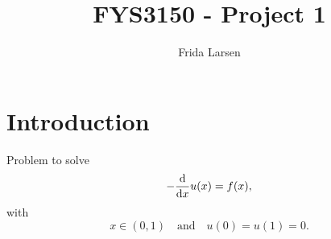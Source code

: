 \documentclass[notitlepage, reprint, nofootinbib]{revtex4-1}
\begin{document}
\title{FYS3150 - Project 1}
\author{Frida Larsen}
\maketitle

\section{Introduction}
{\color{red}{Reference code in github repository.}} Problem to solve
\begin{equation}\label{Poisson}-\dv{x} u(x)=f(x),\end{equation}
with 
\begin{equation}\label{info}x\in (0,1)\quad\text{and}\quad u(0)=u(1)=0.\end{equation}

\end{document}

